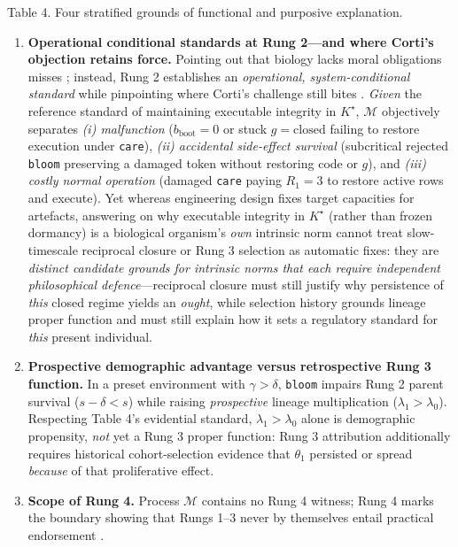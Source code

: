 \documentclass[12pt,letterpaper]{article}
\providecommand{\tightlist}{\setlength{\itemsep}{2pt}\setlength{\parskip}{0pt}}
\begin{document}
Table 4. Four stratified grounds of functional and purposive
explanation.

\begin{enumerate}
\def\labelenumi{\arabic{enumi}.}
\tightlist
\item
  \textbf{Operational conditional standards at Rung 2---and where
  Corti's objection retains force.} Pointing out that biology lacks
  moral obligations misses \citet{corti2023}; instead, Rung 2
  establishes an \emph{operational, system-conditional standard}
  \citep{nagel1977, walsh2015} while pinpointing where Corti's challenge
  still bites \citep{bedau1992, cuciniello2026}. \emph{Given} the
  reference standard of maintaining executable integrity in \(K^\star\),
  \(\mathcal{M}\) objectively separates \emph{(i) malfunction}
  (\(b_{\mathrm{boot}}=0\) or stuck \(g=\mathrm{closed}\) failing to
  restore execution under \texttt{care}), \emph{(ii) accidental
  side-effect survival} (subcritical rejected \texttt{bloom} preserving
  a damaged token without restoring code or \(g\)), and \emph{(iii)
  costly normal operation} (damaged \texttt{care} paying \(R_1=3\) to
  restore active rows and execute). Yet whereas engineering design fixes
  target capacities for artefacts, answering \citet{corti2023} on why
  executable integrity in \(K^\star\) (rather than frozen dormancy) is a
  biological organism's \emph{own} intrinsic norm cannot treat
  slow-timescale reciprocal closure \citep{montevilMossio2015} or Rung 3
  selection \citep{millikan1984, garson2019} as automatic fixes: they
  are \emph{distinct candidate grounds for intrinsic norms that each
  require independent philosophical defence}---reciprocal closure must
  still justify why persistence of \emph{this} closed regime yields an
  \emph{ought}, while selection history grounds lineage proper function
  and must still explain how it sets a regulatory standard for
  \emph{this} present individual.
\item
  \textbf{Prospective demographic advantage versus retrospective Rung 3
  function.} In a preset environment with \(\gamma > \delta\),
  \texttt{bloom} impairs Rung 2 parent survival (\(s-\delta < s\)) while
  raising \emph{prospective} lineage multiplication
  (\(\lambda_1 > \lambda_0\)). Respecting Table 4's evidential standard,
  \(\lambda_1 > \lambda_0\) alone is demographic propensity, \emph{not}
  yet a Rung 3 proper function: Rung 3 attribution additionally requires
  historical cohort-selection evidence that \(\theta_1\) persisted or
  spread \emph{because} of that proliferative effect.
\item
  \textbf{Scope of Rung 4.} Process \(\mathcal{M}\) contains no Rung 4
  witness; Rung 4 marks the boundary showing that Rungs 1--3 never by
  themselves entail practical endorsement
  \citep{korsgaard1996, street2006, list2019}.
\end{enumerate}
\end{document}
